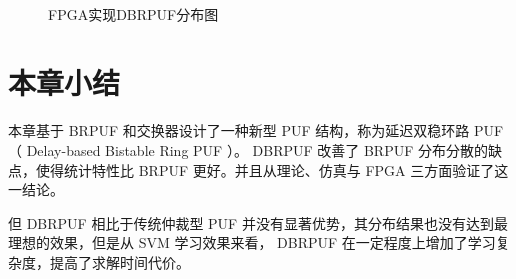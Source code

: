 \begin{figure}[htb!]
\centering
{}\\
\caption{FPGA实现DBRPUF分布图}
\label{fig:dbrpuf_dist_fpga}
\end{figure}


\section{本章小结}
本章基于 BRPUF 和交换器设计了一种新型 PUF 结构，称为延迟双稳环路 PUF （ Delay-based Bistable Ring PUF ）。
DBRPUF 改善了 BRPUF 分布分散的缺点，使得统计特性比 BRPUF 更好。并且从理论、仿真与 FPGA 三方面验证了这一结论。

但 DBRPUF 相比于传统仲裁型 PUF 并没有显著优势，其分布结果也没有达到最理想的效果，但是从 SVM 学习效果来看， DBRPUF 在一定程度上增加了学习复杂度，提高了求解时间代价。
